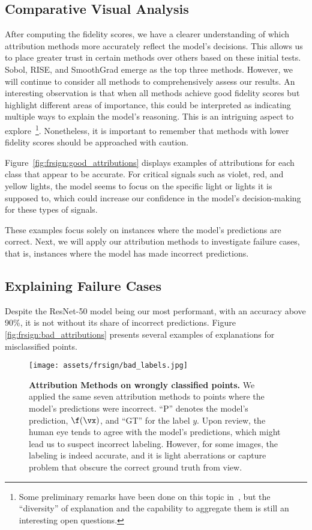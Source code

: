\subsection{Comparative Visual Analysis}

After computing the fidelity scores, we have a clearer understanding of which attribution methods more accurately reflect the model's decisions. This allows us to place greater trust in certain methods over others based on these initial tests. Sobol, RISE, and SmoothGrad emerge as the top three methods. However, we will continue to consider all methods to comprehensively assess our results. An interesting observation is that when all methods achieve good fidelity scores but highlight different areas of importance, this could be interpreted as indicating multiple ways to explain the model's reasoning. This is an intriguing aspect to explore~\footnote{Some preliminary remarks have been done on this topic in~\cite{aggregating2020}, but the ``diversity'' of explanation and the capability to aggregate them is still an interesting open questions.}. Nonetheless, it is important to remember that methods with lower fidelity scores should be approached with caution.

Figure~\autoref{fig:frsign:good_attributions} displays examples of attributions for each class that appear to be accurate. For critical signals such as violet, red, and yellow lights, the model seems to focus on the specific light or lights it is supposed to, which could increase our confidence in the model's decision-making for these types of signals.

These examples focus solely on instances where the model's predictions are correct. Next, we will apply our attribution methods to investigate failure cases, that is, instances where the model has made incorrect predictions.

\subsection{Explaining Failure Cases}

Despite the ResNet-50 model being our most performant, with an accuracy above 90\%, it is not without its share of incorrect predictions. Figure \autoref{fig:frsign:bad_attributions} presents several examples of explanations for misclassified points.

\begin{figure}[ht!]
\centering
\texttt{[image: assets/frsign/bad\_labels.jpg]}
\caption{\textbf{Attribution Methods on wrongly classified points.} We applied the same seven attribution methods to points where the model's predictions were incorrect. ``P'' denotes the model's prediction, $\f(\vx)$, and ``GT'' for the label $y$. Upon review, the human eye tends to agree with the model's predictions, which might lead us to suspect incorrect labeling. However, for some images, the labeling is indeed accurate, and it is light aberrations or capture problem that obscure the correct ground truth from view.}
\label{fig:frsign:bad_attributions}
\end{figure}

